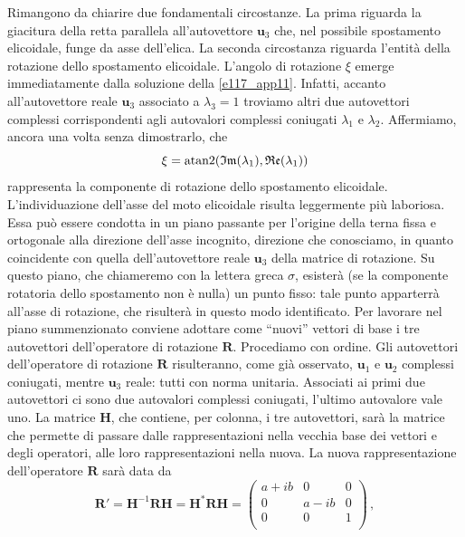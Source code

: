 \noindent Rimangono da chiarire due fondamentali circostanze.
La prima riguarda la giacitura della retta parallela all'autovettore
${\bm u}_3$ che, nel possibile spostamento elicoidale,
funge da asse dell'elica.
La seconda circostanza riguarda l'entit\`a della rotazione
dello spostamento elicoidale. L'angolo di rotazione $\xi$
emerge immediatamente
dalla soluzione della \ref{e117_app11}. Infatti, accanto all'autovettore
reale ${\bm u}_3$ associato a $\lambda_3=1$ troviamo altri due autovettori
complessi corrispondenti agli autovalori complessi coniugati
$\lambda_1$ e $\lambda_2$. Affermiamo, ancora una volta senza dimostrarlo,
che 
\begin{equation}
\xi = \operatorname{atan2} (\mathfrak{Im}( \lambda_1),\mathfrak{Re}( \lambda_1))
\label{eq:comp_rot}
\end{equation}
\noindent rappresenta la componente di rotazione dello spostamento 
elicoidale. 
L'individuazione dell'asse del moto elicoidale risulta
leggermente pi\`u laboriosa. Essa pu\`o essere condotta 
in un piano passante per l'origine della terna fissa e
ortogonale alla direzione dell'asse incognito,
direzione che conosciamo, in quanto coincidente con quella dell'autovettore
reale ${\bm u}_3$ della matrice di rotazione.
Su questo piano, che chiameremo con la lettera greca $\sigma$, 
esister\`a (se la componente
rotatoria dello spostamento non \`e nulla) un punto fisso: tale punto
apparterr\`a all'asse di rotazione, che risulter\`a in questo modo
identificato. Per lavorare nel piano summenzionato conviene adottare
come ``nuovi'' vettori di base i tre autovettori dell'operatore
di rotazione $\bm R$.
Procediamo con ordine.
Gli autovettori dell'operatore di rotazione
$\bm R$ risulteranno, come gi\`a osservato,
${\bm u}_1$ e ${\bm u}_2$ complessi coniugati, mentre ${\bm u}_3$
reale: tutti con norma unitaria.
Associati ai primi due autovettori ci sono due autovalori complessi
coniugati, l'ultimo autovalore vale uno.
La matrice $\bm H$, che contiene, per colonna, i tre autovettori, sar\`a
la matrice che permette di passare dalle rappresentazioni nella
vecchia base dei vettori
e degli operatori, alle loro rappresentazioni nella nuova.
La nuova rappresentazione dell'operatore $\bm R$ 
sar\`a data da
\begin{equation}
{\bm R'}={\bm H}^{-1}{\bm R}{\bm H}={\bm H}^{*}{\bm R}{\bm H}=\left( \begin{array}{ccc}
a+ib & 0 & 0\\
0 & a-ib & 0\\
0 & 0 & 1\\
\end{array}
\right)
\,,
\label{eq:mat_autoval}
\end{equation}

